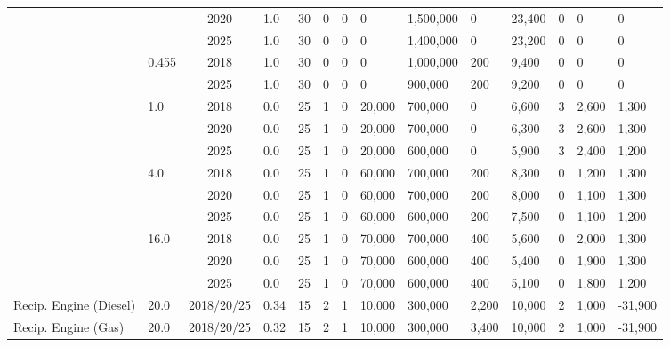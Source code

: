 \begin{table*}[]
\begin{tabularx}{1.0205\linewidth}{|l|l|c|l|l|l|l|l|l|l|l|l|l|l|}
	&  & 2020 & 1.0 & 30 & 0 & 0 & 0 & 1,500,000 & 0 & 23,400 & 0 & 0 & 0 \\ \cline{3-14} 
	&  & 2025 & 1.0 & 30 & 0 & 0 & 0 & 1,400,000 & 0 & 23,200 & 0 & 0 & 0 \\ \cline{2-14} 
	& \multirow{2}{*}{0.455} & 2018 & 1.0 & 30 & 0 & 0 & 0 & 1,000,000 & 200 & 9,400 & 0 & 0 & 0 \\ \cline{3-14} 
	&  & 2025 & 1.0 & 30 & 0 & 0 & 0 & 900,000 & 200 & 9,200 & 0 & 0 & 0 \\ \cline{2-14} 
	& \multirow{3}{*}{1.0} & 2018 & 0.0 & 25 & 1 & 0 & 20,000 & 700,000 & 0 & 6,600 & 3 & 2,600 & 1,300 \\ \cline{3-14} 
	&  & 2020 & 0.0 & 25 & 1 & 0 & 20,000 & 700,000 & 0 & 6,300 & 3 & 2,600 & 1,300 \\ \cline{3-14} 
	&  & 2025 & 0.0 & 25 & 1 & 0 & 20,000 & 600,000 & 0 & 5,900 & 3 & 2,400 & 1,200 \\ \cline{2-14} 
	& \multirow{3}{*}{4.0} & 2018 & 0.0 & 25 & 1 & 0 & 60,000 & 700,000 & 200 & 8,300 & 0 & 1,200 & 1,300 \\ \cline{3-14} 
	&  & 2020 & 0.0 & 25 & 1 & 0 & 60,000 & 700,000 & 200 & 8,000 & 0 & 1,100 & 1,300 \\ \cline{3-14} 
	&  & 2025 & 0.0 & 25 & 1 & 0 & 60,000 & 600,000 & 200 & 7,500 & 0 & 1,100 & 1,200 \\ \cline{2-14} 
	& \multirow{3}{*}{16.0} & 2018 & 0.0 & 25 & 1 & 0 & 70,000 & 700,000 & 400 & 5,600 & 0 & 2,000 & 1,300 \\ \cline{3-14} 
	&  & 2020 & 0.0 & 25 & 1 & 0 & 70,000 & 600,000 & 400 & 5,400 & 0 & 1,900 & 1,300 \\ \cline{3-14} 
	&  & 2025 & 0.0 & 25 & 1 & 0 & 70,000 & 600,000 & 400 & 5,100 & 0 & 1,800 & 1,200 \\ \hline
	Recip. Engine (Diesel) & 20.0 & 2018/20/25 & 0.34 & 15 & 2 & 1 & 10,000 & 300,000 & 2,200 & 10,000 & 2 & 1,000 & -31,900 \\ \hline
	Recip. Engine (Gas) & 20.0 & 2018/20/25 & 0.32 & 15 & 2 & 1 & 10,000 & 300,000 & 3,400 & 10,000 & 2 & 1,000 & -31,900 \\ \hline
		
	\end{tabularx}
		\label{table:modern_plant_costs}
\end{table*}


